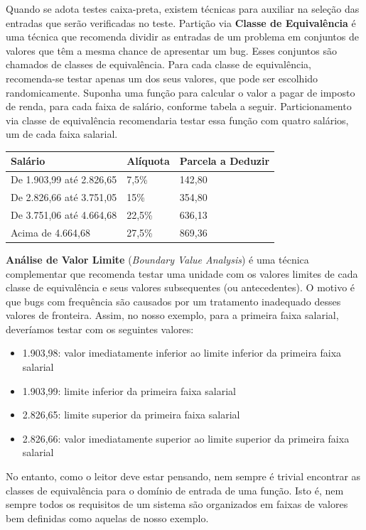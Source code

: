 \documentclass[
  11pt,
  twoside]{book}
\providecommand{\tightlist}{%
  \setlength{\itemsep}{0pt}\setlength{\parskip}{0pt}}
\begin{document}

Quando se adota testes caixa-preta, existem técnicas para auxiliar na
seleção das entradas que serão verificadas no teste. Partição via
\textbf{Classe de Equivalência} é uma técnica que recomenda dividir as
entradas de um problema em conjuntos de valores que têm a mesma chance
de apresentar um bug. Esses conjuntos são chamados de classes de
equivalência. Para cada classe de equivalência, recomenda-se testar
apenas um dos seus valores, que pode ser escolhido randomicamente.
Suponha uma função para calcular o valor a pagar de imposto de renda,
para cada faixa de salário, conforme tabela a seguir. Particionamento
via classe de equivalência recomendaria testar essa função com quatro
salários, um de cada faixa salarial.

\begin{longtable}[]{@{}lll@{}}
\toprule
\textbf{Salário} & \textbf{Alíquota} & \textbf{Parcela a
Deduzir}\tabularnewline
\midrule
\endhead
De 1.903,99 até 2.826,65 & 7,5\% & 142,80\tabularnewline
De 2.826,66 até 3.751,05 & 15\% & 354,80\tabularnewline
De 3.751,06 até 4.664,68 & 22,5\% & 636,13\tabularnewline
Acima de 4.664,68 & 27,5\% & 869,36\tabularnewline
\bottomrule
\end{longtable}

 \textbf{Análise de Valor Limite}
(\emph{Boundary Value Analysis}) é uma técnica complementar que
recomenda testar uma unidade com os valores limites de cada classe de
equivalência e seus valores subsequentes (ou antecedentes). O motivo é
que bugs com frequência são causados por um tratamento inadequado desses
valores de fronteira. Assim, no nosso exemplo, para a primeira faixa
salarial, deveríamos testar com os seguintes valores:

\begin{itemize}
\tightlist
\item
  1.903,98: valor imediatamente inferior ao limite inferior da primeira
  faixa salarial
\item
  1.903,99: limite inferior da primeira faixa salarial
\item
  2.826,65: limite superior da primeira faixa salarial
\item
  2.826,66: valor imediatamente superior ao limite superior da primeira
  faixa salarial
\end{itemize}

No entanto, como o leitor deve estar pensando, nem sempre é trivial
encontrar as classes de equivalência para o domínio de entrada de uma
função. Isto é, nem sempre todos os requisitos de um sistema são
organizados em faixas de valores bem definidas como aquelas de nosso
exemplo.
\end{document}

